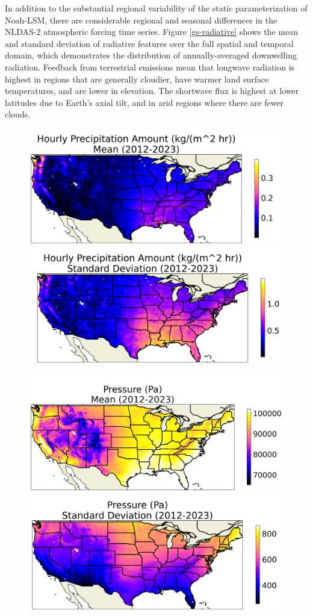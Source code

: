 In addition to the substantial regional variability of the static parameterization of Noah-LSM, there are considerable regional and seasonal differences in the NLDAS-2 atmospheric forcing time series. Figure \ref{gs-radiative} shows the mean and standard deviation of radiative features over the full spatial and temporal domain, which demonstrates the distribution of annually-averaged downwelling radiation. Feedback from terrestrial emissions mean that longwave radiation is highest in regions that are generally cloudier, have warmer land surface temperatures, and are lower in elevation. The shortwave flux is highest at lower latitudes due to Earth's axial tilt, and in arid regions where there are fewer clouds.

\begin{figure}[hp!]
    \centering
    \includegraphics[width=.48\linewidth]{figures/thesis-gridstats/gridstat-bulk_apcp_2012-1_2023-12_y000-195_x000-462_mean.png}
    \includegraphics[width=.48\linewidth]{figures/thesis-gridstats/gridstat-bulk_apcp_2012-1_2023-12_y000-195_x000-462_stdev.png}

    \includegraphics[width=.48\linewidth]{figures/thesis-gridstats/gridstat-bulk_pres_2012-1_2023-12_y000-195_x000-462_mean.png}
    \includegraphics[width=.48\linewidth]{figures/thesis-gridstats/gridstat-bulk_pres_2012-1_2023-12_y000-195_x000-462_stdev.png}


\end{figure}
